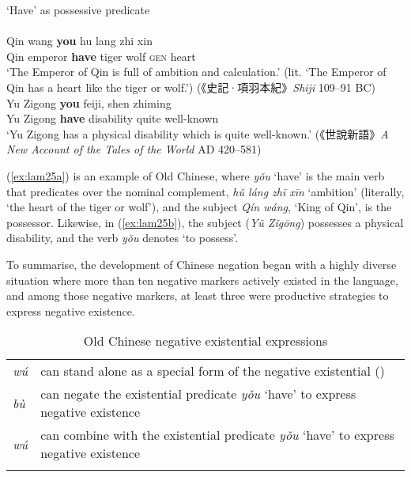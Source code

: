 \documentclass[output=paper,colorlinks,citecolor=brown,chinesefont]{langscibook}
\begin{document}
\ea `Have' as possessive predicate \label{ex:lam25}\\
  \label{ex:lam25a}\\
  	\gll Qin	wang \textbf{you} hu lang zhi xin\\
  	Qin	emperor	\textbf{have} tiger wolf \textsc{gen} heart\\
  	\glt `The Emperor of Qin is full of ambition and calculation.' (lit. `The Emperor of Qin has a heart like the tiger or wolf.') ({\cn《史記·項羽本紀》}\emph{Shiji} 109–91 BC)
   \label{ex:lam25b}\\
  	\gll Yu Zigong \textbf{you} feiji, shen zhiming\\
  	Yu Zigong \textbf{have} disability quite	well-known\\
  	\glt `Yu Zigong has a physical disability which is quite well-known.' ({\cn《世說新語》}\emph{A New Account of the Tales of the World} AD 420–581)
\z \z

(\ref{ex:lam25a}) is an example of Old Chinese, where \textit{yǒu} `have' is the main verb that predicates over the nominal complement, \textit{hǔ láng zhī xīn} `ambition' (literally, `the heart of the tiger or wolf'), and the subject \textit{Qín wáng}, `King of Qin', is the possessor. Likewise, in (\ref{ex:lam25b}), the subject (\emph{Yǔ Zǐgōng}) possesses a physical disability, and the verb \textit{yǒu} denotes `to possess'. 

To summarise, the development of Chinese negation began with a highly diverse situation where more than ten negative markers actively existed in the language, and among those negative markers, at least three were productive strategies to express negative existence.


\begin{table}
  \begin{tabularx}{\textwidth}{lQ}
    \lsptoprule
\textit{wú} & can stand alone as a special form of the negative existential (\citealt{Zhang2002})\\
\textit{bù} & can negate the existential predicate \textit{yǒu} `have' to express negative existence\\ 
\textit{wú} & can combine with the existential predicate \textit{yǒu} `have' to express negative existence\\
\lspbottomrule
\end{tabularx}
  \caption{Old Chinese negative existential expressions}
  \label{ex:lam26}
\end{table}
\end{document}
